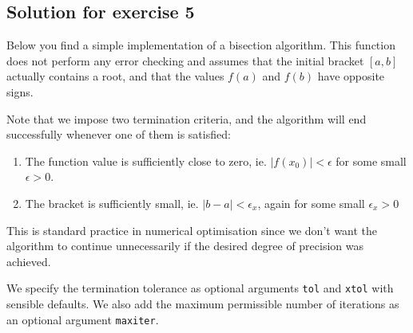 \documentclass[10pt]{scrartcl}
\providecommand{\tightlist}{%
      \setlength{\itemsep}{0pt}\setlength{\parskip}{0pt}}
\begin{document}
    \hypertarget{solution-for-exercise-5}{%
\subsection{Solution for exercise 5}\label{solution-for-exercise-5}}

    Below you find a simple implementation of a bisection algorithm. This
function does not perform any error checking and assumes that the
initial bracket \([a,b]\) actually contains a root, and that the values
\(f(a)\) and \(f(b)\) have opposite signs.

Note that we impose two termination criteria, and the algorithm will end
successfully whenever one of them is satisfied:

\begin{enumerate}
\def\labelenumi{\arabic{enumi}.}
\tightlist
\item
  The function value is sufficiently close to zero, ie.
  \(|f(x_0)| < \epsilon\) for some small \(\epsilon > 0\).
\item
  The bracket is sufficiently small, ie. \(|b-a| < \epsilon_x\), again
  for some small \(\epsilon_x > 0\)
\end{enumerate}

This is standard practice in numerical optimisation since we don't want
the algorithm to continue unnecessarily if the desired degree of
precision was achieved.

We specify the termination tolerance as optional arguments \texttt{tol}
and \texttt{xtol} with sensible defaults. We also add the maximum
permissible number of iterations as an optional argument
\texttt{maxiter}.
\end{document}
